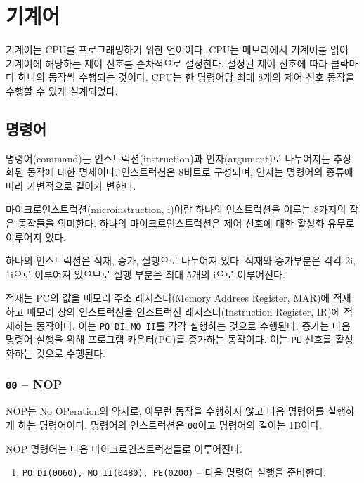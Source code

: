 \documentclass{article}
\begin{document}
\section{기계어}
\label{sec:machlang}

기계어는 CPU를 프로그래밍하기 위한 언어이다.
CPU는 메모리에서 기계어를 읽어 기계어에 해당하는
제어 신호를 순차적으로 설정한다.
설정된 제어 신호에 따라 클락마다 하나의 동작씩 수행되는 것이다.
CPU는 한 명령어당 최대 8개의 제어 신호 동작을 수행할 수 있게
설계되었다.

\subsection{명령어}

명령어(command)는 인스트럭션(instruction)과
인자(argument)로 나누어지는 추상화된 동작에 대한 명세이다.
인스트럭션은 8비트로 구성되며, 인자는 명령어의 종류에 따라
가변적으로 길이가 변한다.

마이크로인스트럭션(microinstruction, \textmu i)이란
하나의 인스트럭션을 이루는 8가지의 작은 동작들을 의미한다.
하나의 마이크로인스트럭션은 제어 신호에 대한 활성화 유무로 이루어져 있다.

하나의 인스트럭션은 적재, 증가, 실행으로 나누어져 있다.
적재와 증가부분은 각각 2\textmu i, 1\textmu i으로 이루어져 있으므로
실행 부분은 최대 5개의 \textmu i으로 이루어진다.

적재는 PC의 값을 메모리 주소 레지스터(Memory Addrees Register, MAR)에
적재하고 메모리 상의 인스트럭션을 인스트럭션 레지스터(Instruction Register, IR)에
적재하는 동작이다. 이는 \texttt{PO DI}, \texttt{MO II}를 각각 실행하는 것으로 수행된다.
증가는 다음 명령어 실행을 위해 프로그램 카운터(PC)를 증가하는 동작이다.
이는 \texttt{PE} 신호를 활성화하는 것으로 수행된다.

\subsubsection{\texttt{00} -- NOP}

NOP는 No OPeration의 약자로, 아무런 동작을 수행하지 않고
다음 명령어를 실행하게 하는 명령어이다.
명령어의 인스트럭션은 \texttt{00}이고 명령어의 길이는 1B이다.

NOP 명령어는 다음 마이크로인스트럭션들로 이루어진다.

\begin{enumerate}
    \item \texttt{PO DI(0060), MO II(0480), PE(0200)} -- 다음 명령어 실행을 준비한다.
\end{enumerate}
\end{document}
